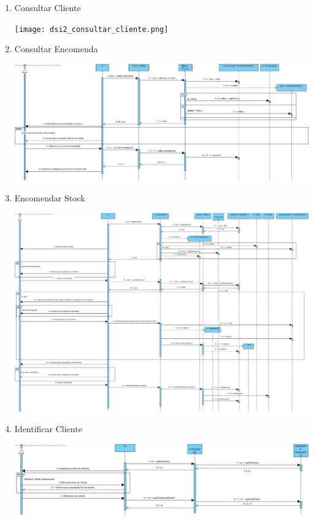 \documentclass[11pt]{article} %
\begin{document}
\begin{enumerate}
\begin{center}
		\end{center}
	\item Consultar Cliente
		\begin{center}
 			\texttt{[image: dsi2\_consultar\_cliente.png]}
		\end{center}
	\item Consultar Encomenda
		\begin{center}
 			\includegraphics[width = 6in]{dsi2_consultar_encomenda.png}
		\end{center}
	\item Encomendar Stock
		\begin{center}
 			\includegraphics[width = 6in]{dsi2_encomendar_stock.png}
		\end{center}
	\item Identificar Cliente
		\begin{center}
 			\includegraphics[width = 6in]{dsi2_identificar_cliente.png}

\end{center}
\end{enumerate}
\end{document}
